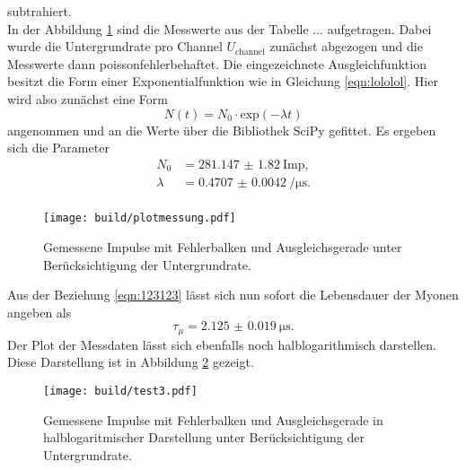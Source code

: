subtrahiert.
\\
In der Abbildung \ref{fig:mess} sind die Messwerte aus der Tabelle ... aufgetragen. Dabei wurde die Untergrundrate pro Channel $U_{\text{channel}}$ zunächst abgezogen und die Messwerte dann
poissonfehlerbehaftet. Die eingezeichnete Ausgleichfunktion besitzt die Form einer Exponentialfunktion wie in Gleichung \ref{eqn:lololol}. Hier wird also zunächst eine Form 
\begin{equation*}
N(t) = N_0 \cdot \text{exp}(-\lambda t)
\end{equation*}
angenommen und an die Werte über die Bibliothek SciPy \cite{scipy} gefittet.
Es ergeben sich die Parameter
\begin{align*}
    N_0 &= \SI{281.147(1820)}{{\text{Imp}}},\\
    \lambda &= \SI{0.4707(42)}{\per\micro\second}.\\
\end{align*}
\begin{figure}
    \centering
    \texttt{[image: build/plotmessung.pdf]}
    \caption{Gemessene Impulse mit Fehlerbalken und Ausgleichsgerade unter Berücksichtigung der Untergrundrate.} 
    \label{fig:mess}
\end{figure}
Aus der Beziehung \ref{eqn:123123} lässt sich nun sofort die Lebensdauer der Myonen angeben als
\begin{equation}
\tau_{\mu} = \SI{2.125(19)}{\micro\second}.
\end{equation}
Der Plot der Messdaten lässt sich ebenfalls noch halblogarithmisch darstellen. Diese Darstellung ist in Abbildung \ref{fig:lol123} gezeigt.
\begin{figure}
    \centering
    \texttt{[image: build/test3.pdf]}
    \caption{Gemessene Impulse mit Fehlerbalken und Ausgleichsgerade in halblogaritmischer Darstellung unter Berücksichtigung der Untergrundrate.} 
    \label{fig:lol123}
\end{figure}

